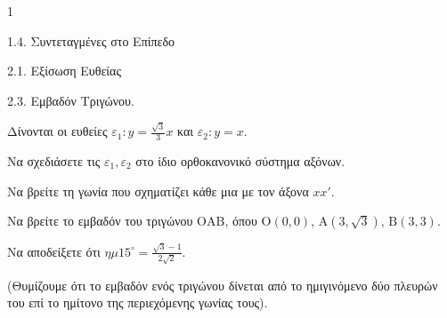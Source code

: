 \begin{ylh}{1}
    \item 1.4. Συντεταγμένες στο Επίπεδο
    \item 2.1. Εξίσωση Ευθείας
    \item 2.3. Εμβαδόν Τριγώνου.
\end{ylh}
Δίνονται οι ευθείες $\varepsilon_1 : y = \frac{\sqrt{3}}{3}x$ και $\varepsilon_2 : y = x$.
\begin{alist}
\item Να σχεδιάσετε τις $\varepsilon_1,\varepsilon_2$ στο ίδιο ορθοκανονικό σύστημα αξόνων. 
\item Να βρείτε τη γωνία που σχηματίζει κάθε μια με τον άξονα $xx'$. 
\item Να βρείτε το εμβαδόν του τριγώνου $\text{OAB}$, όπου $\text{O}(0,0)$, $\text{A}(3,\sqrt{3})$, $\text{B}(3,3)$. 
\item Να αποδείξετε ότι $\eta\mu15^\circ = \frac{\sqrt{3}-1}{2\sqrt{2}}$. 
\end{alist}
(Θυμίζουμε ότι το εμβαδόν ενός τριγώνου δίνεται από το ημιγινόμενο δύο πλευρών του επί το ημίτονο της περιεχόμενης γωνίας τους).